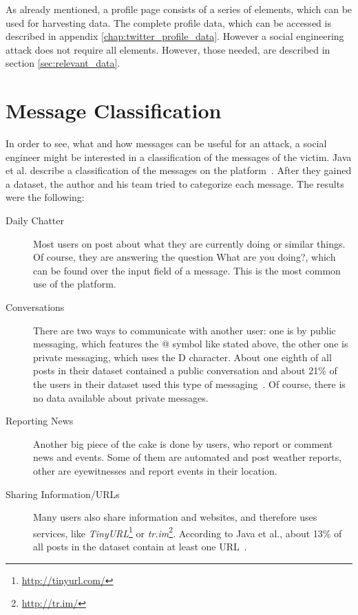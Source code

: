 As already mentioned, a \Twitter{} profile page consists of a series of
elements, which can be used for harvesting data. The complete profile data,
which can be accessed is described in appendix \ref{chap:twitter_profile_data}.
However a social engineering attack does not require all elements. However,
those needed, are described in section \ref{sec:relevant_data}.

\section{Message Classification}

In order to see, what and how messages can be useful for an attack, a social
engineer might be interested in a classification of the messages of the victim.
Java et al. describe a classification of the messages on the \Twitter{}
platform~\cite{java2007}. After they gained a dataset, the author and his team
tried to categorize each message. The results were the following:

\begin{description}

\item[Daily Chatter]
Most users on \Twitter{} post about what they are currently doing or similar
things. Of course, they are answering the question \glqq{}What are you
doing?\grqq{}, which can be found over the input field of a message. This is
the most common use of the \Twitter{} platform.

\item[Conversations]
There are two ways to communicate with another user: one is by public
messaging, which features the @ symbol like stated above, the other one is
private messaging, which uses the D character. About one eighth of all posts
in their dataset contained a public conversation and about 21\% of the users in
their dataset used this type of messaging~\cite{java2007}. Of course, there is
no data available about private messages.

\item[Reporting News]
Another big piece of the cake is done by users, who report or comment news and
events. Some of them are automated and post weather reports, other are
eyewitnesses and report events in their location.

\item[Sharing Information/URLs]
Many users also share information and websites, and therefore uses services,
like \textit{TinyURL}\footnote{\url{http://tinyurl.com/}} or
\textit{tr.im}\footnote{\url{http://tr.im/}}. According to Java et al.,
about 13\% of all posts in the dataset contain at least one URL~\cite{java2007}.

\end{description}


